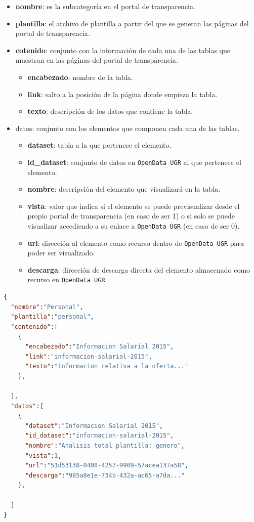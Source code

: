 \begin{itemize}
	\item \textbf{nombre}: es la subcategoría en el portal de transparencia.
	\item \textbf{plantilla}: el archivo de plantilla a partir del que se generan las páginas del portal de transparencia.
	\item \textbf{cotenido}: conjunto con la información de cada una de las tablas que muestran en las páginas del portal de transparencia.
	\begin{itemize}
		\item \textbf{encabezado}: nombre de la tabla.
		\item \textbf{link}: salto a la posición de la página donde empieza la tabla.
		\item \textbf{texto}: descripción de los datos que contiene la tabla.
	\end{itemize}
	\item datos: conjunto con los elementos que componen cada una de las tablas.
	\begin{itemize}
		\item \textbf{dataset}: tabla a la que pertenece el elemento.
		\item \textbf{id\_dataset}: conjunto de datos en {\tt OpenData UGR} al que pertenece el elemento.
		\item \textbf{nombre}: descripción del elemento que visualizará en la tabla.
		\item \textbf{vista}: valor que indica si el elemento se puede previsualizar desde el propio portal de transparencia (en caso de ser 1) o si solo se puede visualizar accediendo a su enlace a {\tt OpenData UGR} (en caso de ser 0).
		\item \textbf{url}: dirección al elemento como recurso dentro de {\tt OpenData UGR} para poder ser visualizado.
		\item \textbf{descarga}: dirección de descarga directa del elemento almacenado como recurso en {\tt OpenData UGR}.
	\end{itemize}
\end{itemize}

\newpage
\begin{lstlisting}[language=json,caption={Archivo JSON con informacion de personal},label={lst:json_personal}]
{
  "nombre":"Personal",
  "plantilla":"personal",
  "contenido":[
    {
      "encabezado":"Informacion Salarial 2015",
      "link":"informacion-salarial-2015",
      "texto":"Informacion relativa a la oferta..."
    },
    
  ],
  "datos":[
    {
      "dataset":"Informacion Salarial 2015",
      "id_dataset":"informacion-salarial-2015",
      "nombre":"Analisis total plantilla: genero",
      "vista":1,
      "url":"51d53138-0408-4257-9909-57acea137a58",
      "descarga":"985a8e1e-734b-432a-ac65-a7da..."
    },
        
  ]
}
\end{lstlisting}

